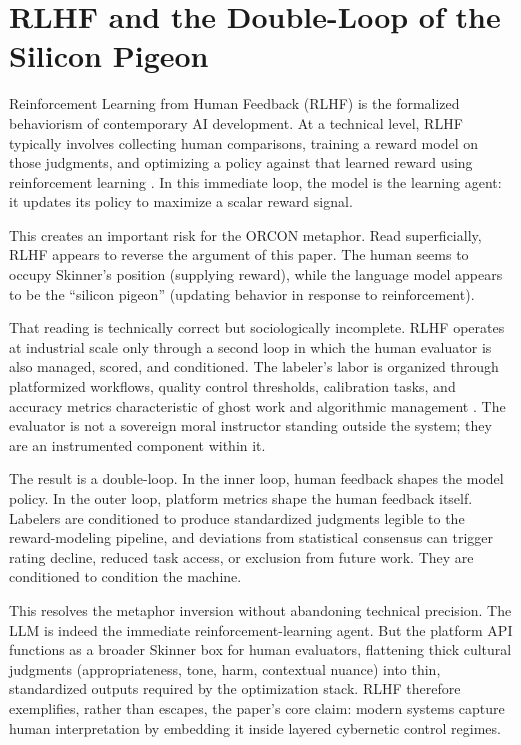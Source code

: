 \documentclass[runningheads]{llncs}
\begin{document}
\section{RLHF and the Double-Loop of the Silicon Pigeon}

Reinforcement Learning from Human Feedback (RLHF) is the formalized behaviorism of contemporary AI development. At a technical level, RLHF typically involves collecting human comparisons, training a reward model on those judgments, and optimizing a policy against that learned reward using reinforcement learning \cite{christiano2017preferences,ouyang2022training,sutton2018reinforcement}. In this immediate loop, the model is the learning agent: it updates its policy to maximize a scalar reward signal.

This creates an important risk for the ORCON metaphor. Read superficially, RLHF appears to reverse the argument of this paper. The human seems to occupy Skinner's position (supplying reward), while the language model appears to be the ``silicon pigeon'' (updating behavior in response to reinforcement).

That reading is technically correct but sociologically incomplete. RLHF operates at industrial scale only through a second loop in which the human evaluator is also managed, scored, and conditioned. The labeler's labor is organized through platformized workflows, quality control thresholds, calibration tasks, and accuracy metrics characteristic of ghost work and algorithmic management \cite{gray2019ghost,kellogg2020algorithms}. The evaluator is not a sovereign moral instructor standing outside the system; they are an instrumented component within it.

The result is a double-loop. In the inner loop, human feedback shapes the model policy. In the outer loop, platform metrics shape the human feedback itself. Labelers are conditioned to produce standardized judgments legible to the reward-modeling pipeline, and deviations from statistical consensus can trigger rating decline, reduced task access, or exclusion from future work. They are conditioned to condition the machine.

This resolves the metaphor inversion without abandoning technical precision. The LLM is indeed the immediate reinforcement-learning agent. But the platform API functions as a broader Skinner box for human evaluators, flattening thick cultural judgments (appropriateness, tone, harm, contextual nuance) into thin, standardized outputs required by the optimization stack. RLHF therefore exemplifies, rather than escapes, the paper's core claim: modern systems capture human interpretation by embedding it inside layered cybernetic control regimes.
\end{document}
